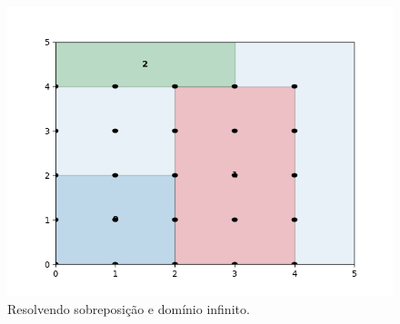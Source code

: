 \begin{figure}[H]
    \centering
    \includegraphics[scale=0.5]{utils/images/discrete_example2}
    \caption{Resolvendo sobreposição e domínio infinito.}
    \label{fig:sobreposicao-dominio5}
\end{figure}
